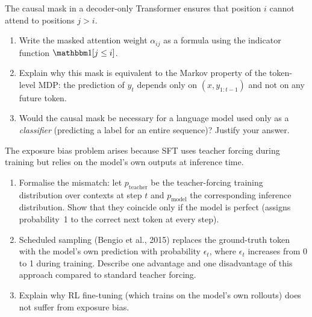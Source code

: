 \begin{exercise}
\label{ex:causal-mask}
The causal mask in a decoder-only Transformer ensures that position $i$ cannot attend to positions $j > i$.
\begin{enumerate}
  \item Write the masked attention weight $\alpha_{ij}$ as a formula using the indicator function $\ind[j \leq i]$.
  \item Explain why this mask is equivalent to the Markov property of the token-level MDP: the prediction of $y_t$ depends only on $(x, y_{1:t-1})$ and not on any future token.
  \item Would the causal mask be necessary for a language model used only as a \emph{classifier} (predicting a label for an entire sequence)? Justify your answer.
\end{enumerate}
\end{exercise}

\begin{exercise}
\label{ex:sft-exposure-bias}
The exposure bias problem arises because SFT uses teacher forcing during training but relies on the model's own outputs at inference time.
\begin{enumerate}
  \item Formalise the mismatch: let $p_{\mathrm{teacher}}$ be the teacher-forcing training distribution over contexts at step $t$ and $p_{\mathrm{model}}$ the corresponding inference distribution. Show that they coincide only if the model is perfect (assigns probability~1 to the correct next token at every step).
  \item Scheduled sampling (Bengio et al., 2015) replaces the ground-truth token with the model's own prediction with probability $\epsilon_t$, where $\epsilon_t$ increases from 0 to 1 during training. Describe one advantage and one disadvantage of this approach compared to standard teacher forcing.
  \item Explain why RL fine-tuning (which trains on the model's own rollouts) does not suffer from exposure bias.
\end{enumerate}
\end{exercise}

